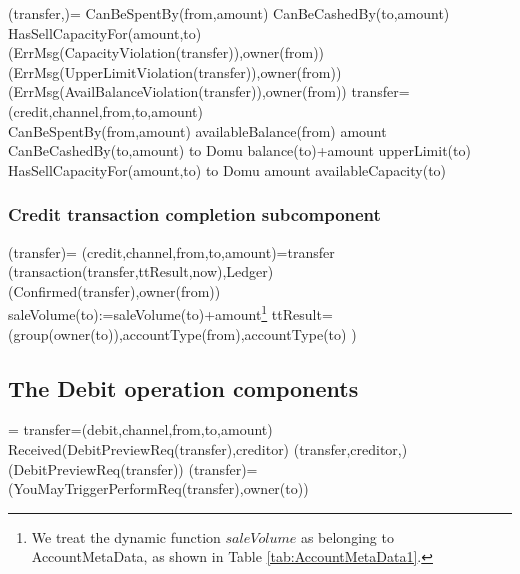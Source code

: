  \begin{asm}
 (transfer,)=\+
	\IF CanBeSpentBy(from,amount) \THEN \+
 		\IF CanBeCashedBy(to,amount) \THEN \+
			\IF HasSellCapacityFor(amount,to) \THEN \+
				 \-
			\ELSE ~ (ErrMsg(CapacityViolation(transfer)),\TO owner(from))\-
		\ELSE ~ (ErrMsg(UpperLimitViolation(transfer)),\TO owner(from))\-
	\ELSE ~ (ErrMsg(AvailBalanceViolation(transfer)),\TO owner(from))\-
 \WHERE \+
 transfer=(credit,channel,from,to,amount)\\
 CanBeSpentBy(from,amount) \IFF availableBalance(from) \geq amount \\
 CanBeCashedBy(to,amount) \IFF  
 to \not \in Domu \AND balance(to)+amount \leq upperLimit(to) \\
 HasSellCapacityFor(amount,to) \IFF  to \not \in Domu \AND   amount \leq availableCapacity(to)
 \end{asm}

 \subsubsection{Credit transaction completion subcomponent}
 \begin{asm}
 	(transfer)=\+  
 	\LET (credit,channel,from,to,amount)=transfer \\ 
 	(transaction(transfer,ttResult,now),Ledger)\\
 	(Confirmed(transfer),\TO owner(from))\\
 	saleVolume(to):=saleVolume(to)+amount\footnote{We treat the dynamic function $saleVolume$ as belonging to AccountMetaData, as shown in Table \ref{tab:AccountMetaData1}.} \-
 	\WHERE \+
 	ttResult= (group(owner(to)),accountType(from),accountType(to) )
 \end{asm}
 
 \subsection{The Debit operation components}
 

\begin{asm}
	  =\+
	\LET transfer=(debit,channel,from,to,amount)\\
	\IF Received(DebitPreviewReq(transfer),\FROM creditor) \THEN \+   
	(transfer,creditor,)\\
	(DebitPreviewReq(transfer)) \dec\-
	\WHERE \+
	(transfer)=\+
	  (YouMayTriggerPerformReq(transfer),\TO  owner(to)) 
\end{asm}
 

